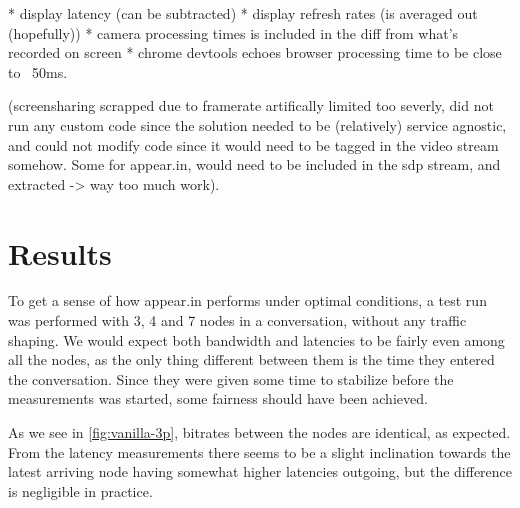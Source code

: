 * display latency (can be subtracted)
* display refresh rates (is averaged out (hopefully))
* camera processing times is included in the diff from what's recorded on screen
* chrome devtools echoes browser processing time to be close to ~50ms.

(screensharing scrapped due to framerate artifically limited too severly, did not run any custom code since the solution needed to be (relatively) service agnostic, and could not modify code since it would need to be tagged in the video stream somehow. Some for appear.in, would need to be included in the sdp stream, and extracted -> way too much work).


\section{Results}

To get a sense of how appear.in performs under optimal conditions, a test run was performed with 3, 4 and 7 nodes in a conversation, without any traffic shaping. We would expect both bandwidth and latencies to be fairly even among all the nodes, as the only thing different between them is the time they entered the conversation. Since they were given some time to stabilize before the measurements was started, some fairness should have been achieved.

As we see in \autoref{fig:vanilla-3p}, bitrates between the nodes are identical, as expected. From the latency measurements there seems to be a slight inclination towards the latest arriving node having somewhat higher latencies outgoing, but the difference is negligible in practice.

